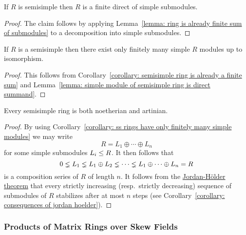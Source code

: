 \begin{corollary}
  \label{corollary: semisimple ring is already a finite sum}
  If $R$ is semisimple then $R$ is a finite direct of simple submodules.
\end{corollary}


\begin{proof}
 The claim follows by applying Lemma~\ref{lemma: ring is already finite sum of submodules} to a decomposition into simple submodules.
\end{proof}


\begin{corollary}
  \label{corollary: ss rings have only finitely many simple modules}
  If $R$ is a semisimple then there exist only finitely many simple $R$ modules up to isomorphism.
\end{corollary}


\begin{proof}
  This follows from Corollary~\ref{corollary: semisimple ring is already a finite sum} and Lemma~\ref{lemma: simple module of semisimple ring is direct summand}.
\end{proof}


\begin{corollary}
  \label{corollary: semisimple rings are notherian artinian}
  Every semisimple ring is both noetherian and artinian.
\end{corollary}


\begin{proof}
  By using Corollary~\ref{corollary: ss rings have only finitely many simple modules} we may write
  \[
    R = L_1 \oplus \dotsb \oplus L_n
  \]
  for some simple submodules $L_i \leq R$.
  It then follows that
  \[
                0
    \lneq L_1
    \lneq L_1 \oplus L_2
    \lneq \dotsb
    \lneq L_1 \oplus \dotsb \oplus L_n
    =           R
  \]
  is a composition series of $R$ of length $n$.
  It follows from the \hyperref[theorem: jordan hoelder theorem]{Jordan-Hölder theorem} that every strictly increasing (resp.\ strictly decreasing) sequence of submodules of $R$ stabilizes after at most $n$ steps (see Corollary~\ref{corollary: consequences of jordan hoelder}).
\end{proof}





\subsubsection{Products of Matrix Rings over Skew Fields}



